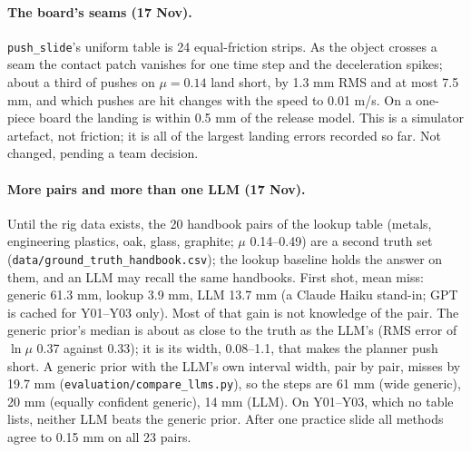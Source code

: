 \documentclass[10pt]{article}
\newcommand{\code}[1]{\texttt{#1}}
\begin{document}
\paragraph{The board's seams (17 Nov).}  \code{push\_slide}'s uniform table is 24 equal-friction strips.  As the object
crosses a seam the contact patch vanishes for one time step and the deceleration spikes; about a third of pushes on
$\mu=0.14$ land short, by 1.3 mm RMS and at most 7.5 mm, and which pushes are hit changes with the speed to 0.01 m/s.  On a
one-piece board the landing is within 0.5 mm of the release model.  This is a simulator artefact, not friction; it is all
of the largest landing errors recorded so far.  Not changed, pending a team decision.

\paragraph{More pairs and more than one LLM (17 Nov).}  Until the rig data exists, the 20 handbook pairs of the lookup
table (metals, engineering plastics, oak, glass, graphite; $\mu$ 0.14--0.49) are a second truth set
(\code{data/ground\_truth\_handbook.csv}); the lookup baseline holds the answer on them, and an LLM may recall the same
handbooks.  First shot, mean miss: generic 61.3 mm, lookup 3.9 mm, LLM 13.7 mm (a Claude Haiku stand-in; GPT is cached for
Y01--Y03 only).  Most of that gain is not knowledge of the pair.  The generic prior's median is about as close to the truth
as the LLM's (RMS error of $\ln\mu$ 0.37 against 0.33); it is its width, 0.08--1.1, that makes the planner push short.  A
generic prior with the LLM's own interval width, pair by pair, misses by 19.7 mm (\code{evaluation/compare\_llms.py}), so
the steps are 61 mm (wide generic), 20 mm (equally confident generic), 14 mm (LLM).  On Y01--Y03, which no table lists,
neither LLM beats the generic prior.  After one practice slide all methods agree to 0.15 mm on all 23 pairs.
\end{document}
